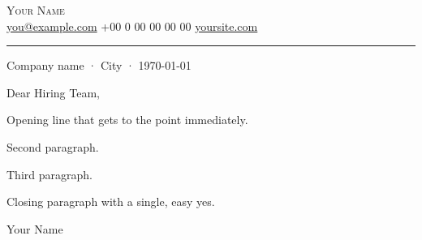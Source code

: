 \documentclass[a4paper,11pt]{article}
\makeatletter
\newcommand{\FullName}{Your Name}
\newcommand{\Email}{you@example.com}
\newcommand{\Phone}{+00 0 00 00 00 00}
\newcommand{\Site}{yoursite.com}
\newcommand{\SiteURL}{https://yoursite.com}
\makeatother
\begin{document}
{\Huge\scshape \FullName}\\[3pt]
{\color{mid}\small
  \href{mailto:\Email}{\Email} \textbar{} \Phone{} \textbar{}
  \href{\SiteURL}{\Site}}\\[4pt]
{\color{rule}\hrule}
\vspace{10pt}

{\color{mid}\small Company name · City · \today}
\vspace{10pt}

Dear Hiring Team,

Opening line that gets to the point immediately.

Second paragraph.

Third paragraph.

Closing paragraph with a single, easy yes.

\vspace{8pt}
\FullName
\end{document}
